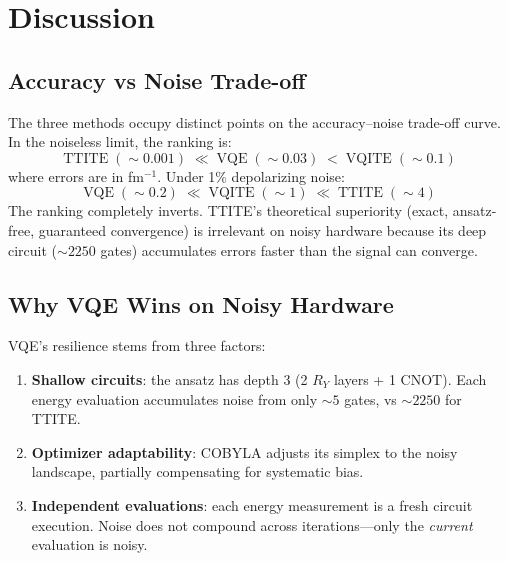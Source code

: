 \documentclass[11pt,a4paper]{article}
\begin{document}
\section{Discussion}

\subsection{Accuracy vs Noise Trade-off}

The three methods occupy distinct points on the accuracy--noise trade-off
curve. In the noiseless limit, the ranking is:
\begin{equation*}
  \text{TTITE} \;(\sim\!0.001) \;\ll\;
  \text{VQE} \;(\sim\!0.03) \;<\;
  \text{VQITE} \;(\sim\!0.1)
\end{equation*}
where errors are in fm$^{-1}$. Under 1\% depolarizing noise:
\begin{equation*}
  \text{VQE} \;(\sim\!0.2) \;\ll\;
  \text{VQITE} \;(\sim\!1) \;\ll\;
  \text{TTITE} \;(\sim\!4)
\end{equation*}
The ranking completely inverts. TTITE's theoretical superiority (exact,
ansatz-free, guaranteed convergence) is irrelevant on noisy hardware
because its deep circuit ($\sim\!2250$ gates) accumulates errors
faster than the signal can converge.

\subsection{Why VQE Wins on Noisy Hardware}

VQE's resilience stems from three factors:
\begin{enumerate}[nosep]
  \item \textbf{Shallow circuits}: the ansatz has depth 3 (2 $R_Y$ layers
    + 1 CNOT). Each energy evaluation accumulates noise from only
    $\sim\!5$ gates, vs $\sim\!2250$ for TTITE.
  \item \textbf{Optimizer adaptability}: COBYLA adjusts its simplex to
    the noisy landscape, partially compensating for systematic bias.
  \item \textbf{Independent evaluations}: each energy measurement is a
    fresh circuit execution. Noise does not compound across iterations---only
    the \emph{current} evaluation is noisy.
\end{enumerate}
\end{document}
